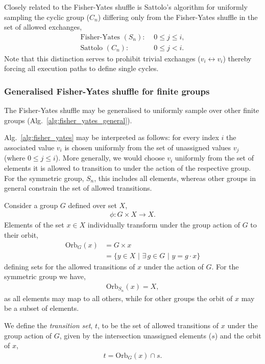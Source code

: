 \documentclass[twocolumn, aps, amsmath, amssymb, nofootinbib, superscriptaddress, longbibliography, floatfix, eqsecnum, rmp]{revtex4-2}
\begin{document}
Closely related to the Fisher-Yates shuffle is Sattolo's algorithm \cite{Sattolo86} for uniformly sampling the cyclic group ($C_n$) differing only from the Fisher-Yates shuffle in the set of allowed exchanges,
\begin{align}
	\text{Fisher-Yates }(S_n):\,\,& 0\leq j\leq i,\nonumber\\
	\text{Sattolo }(C_n):\,\,& 0\leq j<i.
\end{align}
Note that this distinction serves to prohibit trivial exchanges ($v_i\leftrightarrow v_i$) thereby forcing all execution paths to define single cycles.

\subsubsection{Generalised Fisher-Yates shuffle for finite groups}

The Fisher-Yates shuffle may be generalised to uniformly sample over other finite groups (Alg.~\ref{alg:fisher_yates_general}).

Alg.~\ref{alg:fisher_yates} may be interpreted as follows: for every index $i$ the associated value $v_i$ is chosen uniformly from the set of unassigned values $v_j$ (where $0\leq j\leq i$). More generally, we would choose $v_i$ uniformly from the set of elements it is allowed to transition to under the action of the respective group. For the symmetric group, $S_n$, this includes all elements, whereas other groups in general constrain the set of allowed transitions.

Consider a group $G$ defined over set $X$,
\begin{align}
	\phi: G\times X \to X.	
\end{align}
Elements of the set $x\in X$ individually transform under the group action of $G$ to their orbit,
\begin{align}
	\mathrm{Orb}_G(x) &= G\times x \nonumber\\
	&= \{ y\in X \,\,|\,\, \exists \,g\in G \,\,|\,\, y=g\cdot x\}
\end{align}
defining sets for the allowed transitions of $x$ under the action of $G$. For the symmetric group we have,
\begin{align}
	\mathrm{Orb}_{S_n}(x) = X,
\end{align}
as all elements may map to all others, while for other groups the orbit of $x$ may be a subset of elements.

We define the \emph{transition set}, $t$, to be the set of allowed transitions of $x$ under the group action of $G$, given by the intersection unassigned elements ($s$) and the orbit of $x$,
\begin{align}
	t = \mathrm{Orb}_G(x) \cap s.
\end{align}
\end{document}
